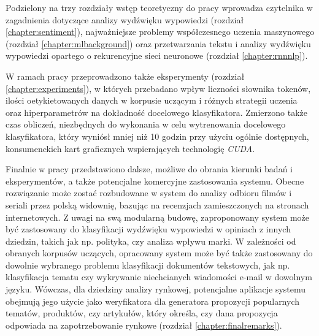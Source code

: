 Podzielony na trzy rozdziały wstęp teoretyczny do pracy wprowadza czytelnika w zagadnienia dotyczące analizy wydźwięku wypowiedzi (rozdział \ref{chapter:sentiment}), najważniejsze problemy współczesnego uczenia maszynowego (rozdział \ref{chapter:mlbackground}) oraz przetwarzania tekstu i analizy wydźwięku wypowiedzi opartego o rekurencyjne sieci neuronowe (rozdział \ref{chapter:rnnnlp}).

W ramach pracy przeprowadzono także eksperymenty (rozdział \ref{chapter:experiments}), w których przebadano wpływ liczności słownika tokenów, ilości oetykietowanych danych w korpusie uczącym i różnych strategii uczenia oraz hiperparametrów na dokładność docelowego klasyfikatora. Zmierzono także czas obliczeń, niezbędnych do wykonania w celu wytrenowania docelowego klasyfikatora, który wyniósł mniej niż 10 godzin przy użyciu ogólnie dostępnych, konsumenckich kart graficznych wspierających technologię \emph{CUDA}.

Finalnie w pracy przedstawiono dalsze, możliwe do obrania kierunki badań i eksperymentów, a także potencjalne komercyjne zastosowania systemu. Obecne rozwiązanie może zostać rozbudowane w system do analizy odbioru filmów i seriali przez polską widownię, bazując na recenzjach zamieszczonych na stronach internetowych. Z uwagi na swą modularną budowę, zaproponowany system może być zastosowany do klasyfikacji wydźwięku wypowiedzi w opiniach z innych dziedzin, takich jak np. polityka, czy analiza wpływu marki. W zależności od obranych korpusów uczących, opracowany system może być także zastosowany do dowolnie wybranego problemu klasyfikacji dokumentów tekstowych, jak np. klasyfikacja tematu czy wykrywanie niechcianych wiadomości e-mail w dowolnym języku. Wówczas, dla dziedziny analizy rynkowej, potencjalne aplikacje systemu obejmują jego użycie jako weryfikatora dla generatora propozycji popularnych tematów, produktów, czy artykułów, który określa, czy dana propozycja odpowiada na zapotrzebowanie rynkowe (rozdział \ref{chapter:finalremarks}).